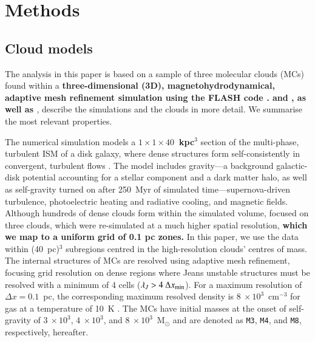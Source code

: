 \section{Methods}\label{methods}


\subsection{Cloud models}\label{methods:clouds}

The analysis in this paper is based on a sample of three molecular clouds (MCs) found within a \textbf{three-dimensional (3D), magnetohydrodynamical, adaptive mesh refinement simulation using the FLASH code \citep{Fryxell2000}.  
 and , as well as \citet[ hereafter]{Chira2018}}, describe the simulations and the clouds in more detail. 
We summarise the most relevant properties. 

The numerical simulation models a \textbf{$1\times1\times40$~kpc$^3$} section of the multi-phase, turbulent ISM of a disk galaxy, where dense structures form self-consistently in convergent, turbulent flows .  
The model includes gravity---a background galactic-disk potential accounting for a stellar component and a dark matter halo, as well as self-gravity turned on after 250~Myr of simulated time---supernova-driven turbulence, photoelectric heating and radiative cooling, and magnetic fields. 
Although hundreds of dense clouds form within the simulated volume,  focused on three clouds, which were re-simulated at a much higher spatial resolution, \textbf{which we map to a uniform grid of 0.1 pc zones.}
In this paper, we use the data within (40~pc)$^{3}$ subregions centred in the high-resolution clouds' centres of mass.
The internal structures of MCs are resolved using adaptive mesh refinement, focusing grid resolution on dense regions where Jeans unstable structures must be resolved with a minimum of 4 cells ($\lambda_J > 4~\Delta x_{\rm min}$).
For a maximum resolution of $\Delta x = 0.1$~pc, the corresponding maximum resolved density is $8~\times 10^3$~cm$^{-3}$ for gas at a temperature of 10~K .
The MCs have initial masses at the onset of self-gravity of $3~\times 10^3$, $4~\times 10^3$, and $8~\times 10^3$~M$_{\odot}$ and are denoted as \texttt{M3}, \texttt{M4}, and \texttt{M8}, respectively, hereafter.

